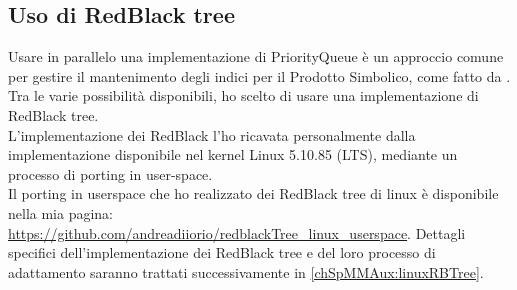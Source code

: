 \subsection{Uso di RedBlack tree} \label{chSpMMSymb:usoRBTree}
Usare in parallelo una implementazione di PriorityQueue è un approccio comune
per gestire il mantenimento degli indici \nnz per il Prodotto Simbolico, come fatto da \cite{SpMM_KNL_Multicore_symbsSols}.\\
Tra le varie possibilità disponibili, ho scelto di usare una implementazione di RedBlack tree.\\
L'implementazione dei RedBlack l'ho ricavata personalmente dalla implementazione disponibile nel kernel Linux 5.10.85 (LTS),
mediante un processo di porting in user-space.\\
Il porting in userspace che ho realizzato dei RedBlack tree di linux è disponibile nella mia pagina: \url{https://github.com/andreadiiorio/redblackTree_linux_userspace}.
Dettagli specifici dell'implementazione dei RedBlack tree e del loro processo di adattamento saranno trattati successivamente in \ref{chSpMMAux:linuxRBTree}.\\

